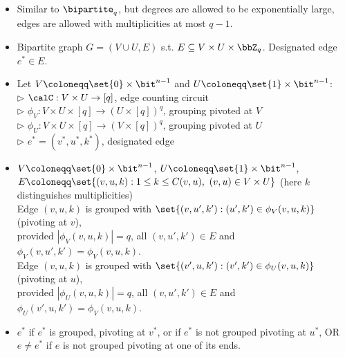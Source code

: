 \noindent
\begin{minipage}{\linewidth}
\begin{definition}
	\label{def:succ-bipartite} \vspace{-5pt}
	\begin{itemize}[leftmargin=2.15cm,itemsep=4pt]
		\item[\slshape Principle:] Similar to $\bipartite_q$, but degrees are allowed to be exponentially large, edges are allowed with multiplicities at most $q-1$.
		\item[\slshape Object:] Bipartite graph $G = (V \cup U, E)$ s.t. $E \subseteq V \times U \times \bbZ_q$. Designated edge $e^* \in E$.
		\item[\slshape Inputs:] Let $V \coloneqq \set{0} \times \bit^{n-1}$ and $U \coloneqq \set{1} \times \bit^{n-1}$:\\
	$\triangleright$ $\calC:V \times U \to [q]$, edge counting circuit\\
	$\triangleright$ $\phi_V: V \times U \times [q] \to (U \times [q])^{q}$, grouping pivoted at $V$\\
	$\triangleright$ $\phi_U: V \times U \times [q] \to (V \times [q])^{q}$, grouping pivoted at $U$\\
	$\triangleright$ $e^* = (v^*, u^*, k^*)$, designated edge
		\item[\slshape Encoding:] $V \coloneqq \set{0} \times \bit^{n-1}$, $U \coloneqq \set{1} \times \bit^{n-1}$,\\
	$E \coloneqq \set{(v,u,k) : 1 \le k \le C(v,u),\ (v,u) \in V \times U}$ (here $k$ distinguishes multiplicities)\\
	Edge $(v,u,k)$ is grouped with $\set{(v, u', k') : (u',k') \in \phi_V(v,u,k)}$ (pivoting at $v$),\\
	\hspace*{1cm} provided $|\phi_V(v,u,k)| = q$, all $(v,u',k') \in E$ and $\phi_V(v,u',k') = \phi_V(v,u,k)$.\\
	Edge $(v,u,k)$ is grouped with $\set{(v', u, k') : (v',k') \in \phi_U(v,u,k)}$ (pivoting at $u$),\\
	\hspace*{1cm} provided $|\phi_U(v,u,k)| = q$, all $(v,u',k') \in E$ and $\phi_U(v',u,k') = \phi_V(v,u,k)$.
		\item[\slshape Solutions:] $e^*$ if $e^*$ is grouped, pivoting at $v^*$, or if $e^*$ is not grouped pivoting at $u^*$, OR\\
	$e \ne e^*$ if $e$ is not grouped pivoting at one of its ends.
	\end{itemize}
\end{definition}
\end{minipage}\vspace{5mm}

